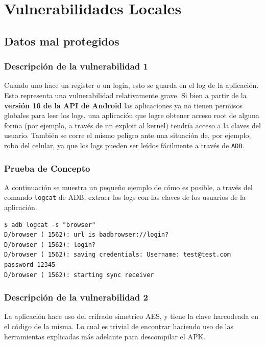 \documentclass[11pt, a4paper, twoside]{article}
\begin{document}
\clearpage{\pagestyle{empty}}

\clearpage{%
  \pagestyle{empty}\tableofcontents%
  \vspace{3cm}%
  \cleardoublepage%
}
\setcounter{page}{1}

%
%
\section{Vulnerabilidades Locales}
%
%
\subsection{Datos mal protegidos}

\subsubsection{Descripción de la vulnerabilidad 1}
Cuando uno hace un register o un login, esto se guarda en el log de la aplicación. Esto representa una vulnerabilidad relativamente grave. Si bien a partir de la \textbf{versión 16 de la API de Android} las aplicaciones ya no tienen permisos globales para leer los logs, una aplicación que logre obtener acceso root de alguna forma (por ejemplo, a través de un exploit al kernel) tendría acceso a la claves del usuario. También se corre el mismo peligro ante una situación de, por ejemplo, robo del celular, ya que los logs pueden ser leídos fácilmente a través de \texttt{ADB}.

\subsubsection{Prueba de Concepto}
A continuación se muestra un pequeño ejemplo de cómo es posible, a través del comando \texttt{logcat} de ADB, extraer los logs con las claves de los usuarios de la aplicación.

\begin{Verbatim}[frame=single]
$ adb logcat -s "browser"
D/browser ( 1562): url is badbrowser://login?
D/browser ( 1562): login?
D/browser ( 1562): saving credentials: Username: test@test.com password 12345
D/browser ( 1562): starting sync receiver
\end{Verbatim}

\subsubsection{Descripción de la vulnerabilidad 2}
La aplicación hace uso del crifrado simetrico AES, y tiene la clave harcodeada en el código de la misma. Lo cual es trivial de encontrar haciendo uso de las herramientas explicadas más adelante para descompilar el APK.
\end{document}
